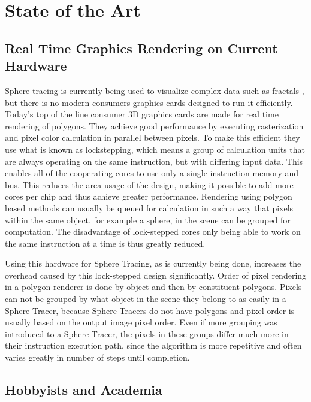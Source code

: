 \chapter{State of the Art}

	\section{ Real Time Graphics Rendering on Current Hardware } 

		Sphere tracing is currently being used to visualize complex data such
		as fractals \cite{TODO}, but there is no modern consumers graphics
		cards designed to run it efficiently.  Today's top of the line consumer
		3D graphics cards are made for real time rendering of
		polygons\cite{TODO}. They achieve good performance by executing
		rasterization and pixel color calculation in parallel between pixels.
		To make this efficient they use what is known as lockstepping, which
		means a group of calculation units that are always operating on the
		same instruction, but with differing input data. This enables all of
		the cooperating cores to use only a single instruction memory and bus.
		This reduces the area usage of the design, making it possible to add
		more cores per chip and thus achieve greater performance. Rendering
		using polygon based methods can usually be queued for calculation in
		such a way that pixels within the same object, for example a sphere, in
		the scene can be grouped for computation. The disadvantage of
		lock-stepped cores only being able to work on the same instruction at a
		time is thus greatly reduced.
		
		Using this hardware for Sphere Tracing, as is currently being done,
		increases the overhead caused by this lock-stepped design significantly. 
		Order of pixel rendering in a polygon renderer is done by object and 
		then by constituent polygons. Pixels can not be grouped by what object 
		in the scene they belong to as easily in a Sphere Tracer, because 
		Sphere Tracers do not have polygons and pixel order is usually based on 
		the output image pixel order. Even if more grouping was introduced to a 
		Sphere Tracer, the pixels in these groups differ much more in their 
		instruction execution path, since the algorithm is more repetitive and 
		often varies greatly in number of steps until completion.
		
	\section{ Hobbyists and Academia }


